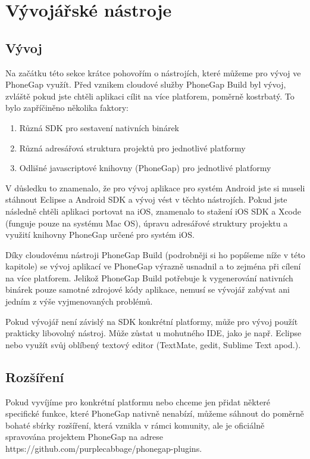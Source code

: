 \section{Vývojářské nástroje}
\subsection{Vývoj}
Na začátku této sekce krátce pohovořím o nástrojích, které můžeme pro vývoj ve PhoneGap využít. Před vznikem cloudové služby PhoneGap Build byl vývoj, zvláště pokud jste chtěli aplikaci cílit na více platforem, poměrně kostrbatý. To bylo zapříčiněno několika faktory:

\begin{enumerate}
	\item Různá SDK pro sestavení nativních binárek
	\item Různá adresářová struktura projektů pro jednotlivé platformy
	\item Odlišné javascriptové knihovny (PhoneGap) pro jednotlivé platformy
\end{enumerate}

V důsledku to znamenalo, že pro vývoj aplikace pro systém Android jste si museli stáhnout Eclipse a Android SDK a vývoj vést v těchto nástrojích. Pokud jste následně chtěli aplikaci portovat na iOS, znamenalo to stažení iOS SDK a Xcode (funguje pouze na systému Mac OS), úpravu adresářové struktury projektu a využití knihovny PhoneGap určené pro systém iOS.

Díky cloudovému nástroji PhoneGap Build (podrobněji si ho popíšeme níže v této kapitole) se vývoj aplikací ve PhoneGap výrazně usnadnil a to zejména při cílení na více platforem. Jelikož PhoneGap Build potřebuje k vygenerování nativních binárek pouze samotné zdrojové kódy aplikace, nemusí se vývojář zabývat ani jedním z výše vyjmenovaných problémů.

Pokud vývojář není závislý na SDK konkrétní platformy, může pro vývoj použít prakticky libovolný nástroj. Může zůstat u mohutného IDE, jako je např. Eclipse nebo využít svůj oblíbený textový editor (TextMate, gedit, Sublime Text apod.).

\subsection{Rozšíření}
Pokud vyvíjíme pro konkrétní platformu nebo chceme jen přidat některé specifické funkce, které PhoneGap nativně nenabízí, můžeme sáhnout do poměrně bohaté sbírky rozšíření, která vznikla v rámci komunity, ale je oficiálně spravována projektem PhoneGap na adrese https://github.com/purplecabbage/phonegap-plugins. %

